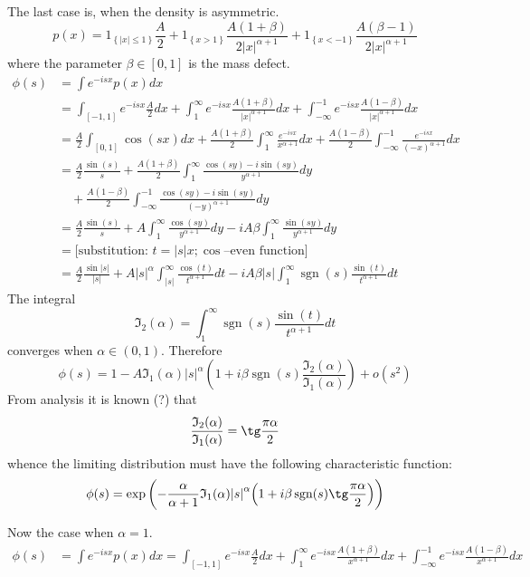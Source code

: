 \documentclass[a4paper]{article}
\newcommand{\obj}[1]{{\left\{ #1 \right \}}}
\newcommand{\clo}[1]{{\left [ #1 \right ]}}
\newcommand{\brac}[1]{{\left ( #1 \right )}}
\newcommand{\abs}[1]{{\left | #1 \right |}}
\newcommand{\Ical}{\mathfrak{I}}
\newcommand{\sign}{\mathop{\text{sgn}}\nolimits}
\begin{document}
The last case is, when the density is asymmetric.
\[p(x) = 1_\obj{\abs{x}\leq 1}\frac{A}{2}
	+ 1_\obj{x>1}\frac{A(1+\beta)}{2\abs{x}^{\alpha+1}}
	+ 1_\obj{x<-1}\frac{A(\beta-1)}{2\abs{x}^{\alpha+1}}\]
where the parameter $\beta \in \clo{0,1}$ is the mass defect.
\begin{align*}
	\phi(s) &= \int e^{-isx}p(x)dx\\
	&= \int_\clo{-1,1} e^{-isx}\frac{A}{2}dx
		+ \int_1^\infty e^{-isx}\frac{A(1+\beta)}{|x|^{\alpha+1}}dx
		+ \int_{-\infty}^{-1} e^{-isx}\frac{A(1-\beta)}{|x|^{\alpha+1}}dx\\
	&= \frac{A}{2} \int_\clo{0,1} \cos(sx)dx 
		+ \frac{A(1+\beta)}{2}\int_1^\infty \frac{e^{-isx}}{x^{\alpha+1}}dx 
		+ \frac{A(1-\beta)}{2}\int_{-\infty}^{-1} \frac{e^{-isx}}{(-x)^{\alpha+1}}dx\\
	&= \frac{A}{2} \frac{\sin(s)}{s} 
		+ \frac{A(1+\beta)}{2} \int_1^\infty \frac{\cos(sy) - i\sin(sy)}{y^{\alpha+1}}dy \\
		&\quad + \frac{A(1-\beta)}{2} \int_{-\infty}^{-1} \frac{\cos(sy) - i\sin(sy)}{(-y)^{\alpha+1}}dy\\
	&= \frac{A}{2} \frac{\sin(s)}{s} 
		+ A \int_1^\infty \frac{\cos(sy)}{y^{\alpha+1}}dy 
		- i A\beta \int_1^\infty \frac{\sin(sy)}{y^{\alpha+1}}dy\\
	&= \Big[ \text{substitution: } t = \abs{s} x; \cos\text{--even function}\Big ]\\
	&= \frac{A}{2} \frac{\sin\abs{s}}{\abs{s}} 
		+ A \abs{s}^\alpha \int_{\abs{s}}^\infty \frac{\cos(t)}{t^{\alpha+1}}dt
		- i A\beta \abs{s} \int_1^\infty \sign(s) \frac{\sin(t)}{t^{\alpha+1}}dt
\end{align*}
The integral
\[\Ical_2(\alpha) = \int_1^\infty \sign(s) \frac{\sin(t)}{t^{\alpha+1}}dt\]
converges when $\alpha\in\brac{0,1}$. Therefore 
\[\phi(s) = 1 - A \Ical_1(\alpha)\abs{s}^\alpha \brac{1+i\beta \sign(s) \frac{\Ical_2(\alpha)}{ \Ical_1(\alpha)}} + o(s^2)\]
From analysis it is known (?) that
\[\frac{\Ical_2(\alpha)}{ \Ical_1(\alpha)} = \tg\frac{\pi \alpha}{2}\]
whence the limiting distribution must have the following characteristic function:
\[\phi(s) = \exp\brac{-\frac{\alpha}{\alpha+1} \Ical_1(\alpha)\abs{s}^\alpha \brac{1+i\beta \sign(s) \tg\frac{\pi \alpha}{2} } }\]

Now the case when $\alpha=1$.
\begin{align*}
	\phi(s) &= \int e^{-isx}p(x)dx
	= \int_\clo{-1,1} e^{-isx}\frac{A}{2}dx
		+ \int_1^\infty e^{-isx}\frac{A(1+\beta)}{x^{\alpha+1}}dx
		+ \int_{-\infty}^{-1} e^{-isx}\frac{A(1-\beta)}{x^{\alpha+1}}dx
\end{align*}
\end{document}
